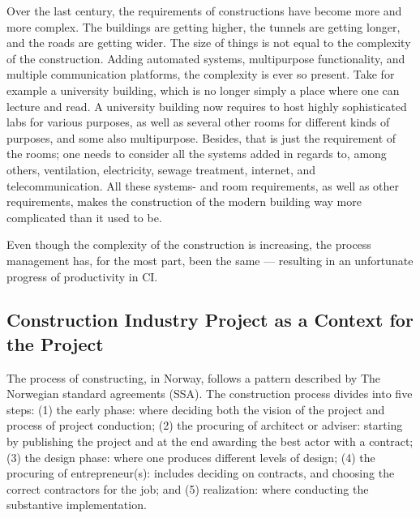 Over the last century, the requirements of constructions have become more and more complex. The buildings are getting higher, the tunnels are getting longer, and the roads are getting wider. The size of things is not equal to the complexity of the construction. Adding automated systems, multipurpose functionality, and multiple communication platforms, the complexity is ever so present. Take for example a university building, which is no longer simply a place where one can lecture and read. A university building now requires to host highly sophisticated labs for various purposes, as well as several other rooms for different kinds of purposes, and some also multipurpose. Besides, that is just the requirement of the rooms; one needs to consider all the systems added in regards to, among others, ventilation, electricity, sewage treatment, internet, and telecommunication. All these systems- and room requirements, as well as other requirements, makes the construction of the modern building way more complicated than it used to be. 

Even though the complexity of the construction is increasing, the process management has, for the most part, been the same — resulting in an unfortunate progress of productivity in CI. 

\subsection{Construction Industry Project as a Context for the Project} \label{sec:CI_context}
The process of constructing, in Norway, follows a pattern described by The Norwegian standard agreements (SSA). The construction process divides into five steps: (1) the early phase: where deciding both the vision of the project and process of project conduction; (2) the procuring of architect or adviser: starting by publishing the project and at the end awarding the best actor with a contract; (3) the design phase: where one produces different levels of  design; (4) the procuring of entrepreneur(s): includes deciding on contracts, and choosing the correct contractors for the job; and (5) realization: where conducting the substantive implementation. 


